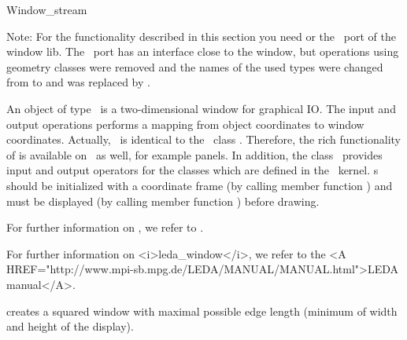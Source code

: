 \ccSetTwoColumns{}{\hspace*{8.5cm}}


\medskip
\begin{ccClass} {Window_stream}

Note: For the functionality described in this section you need \leda or
the \cgal\ port of the \leda window lib. The \cgal\ port has an interface
close to the \leda window, but operations using \leda geometry classes
were removed and the names of the used types were changed from
 to  and 
was replaced by .

\ccDefinition 

An object of type \ccClassName\ is a two-dimensional window for
graphical IO. The input and output operations performs a mapping from
object coordinates to window coordinates.
Actually, \ccClassName\ is identical to the \leda\ class .
Therefore, the rich functionality of  is available on
\ccClassName\ as well, for example panels.
In addition, the class \ccClassName\ provides input and output 
operators for the classes which are defined in the \cgal\ kernel.
\ccClassName s should be initialized with a coordinate frame (by calling member function
) and must be displayed (by calling member function ) before
drawing.
 
\begin{ccTexOnly}
For further information on , we refer to \cite{mnsu-lum}.
\end{ccTexOnly}
\begin{ccHtmlOnly}
For further information on <i>leda_window</i>, we refer to the 
<A HREF="http://www.mpi-sb.mpg.de/LEDA/MANUAL/MANUAL.html">LEDA manual</A>.
\end{ccHtmlOnly}


\ccCreation
{}
{creates a squared window with maximal possible edge length
(minimum of width and height of the display).}


\end{ccClass}
